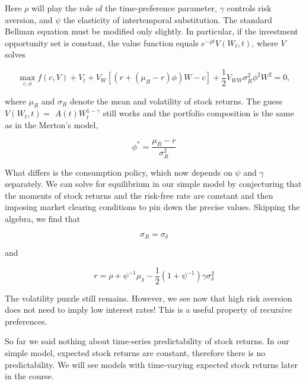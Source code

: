 \documentclass[\topdir/lecture\_notes.tex]{subfiles}
\begin{document}
Here \(\rho\) will play the role of the time-preference parameter, \(\gamma\) controls risk aversion, and \(\psi\) the elasticity of intertemporal substitution. The standard Bellman equation must be modified only slightly. In particular, if the investment opportunity set is constant, the value function equals \(e^{-\rho t} V\left(W_{t}, t\right)\), where \(V\) solves

\begin{equation}
\max _{c, \phi} f(c, V)+V_{t}+V_{W}\left[\left(r+\left(\mu_{R}-r\right) \phi\right) W-c\right]+\frac{1}{2} V_{W W} \sigma_{R}^{2} \phi^{2} W^{2}=0,
\end{equation}

where \(\mu_{R}\) and \(\sigma_{R}\) denote the mean and volatility of stock returns. The guess \(V\left(W_{t}, t\right)=\) \(A(t) W_{t}^{1-\gamma}\) still works and the portfolio composition is the same as in the Merton's model,

\begin{equation}
\phi^{*}=\frac{\mu_{R}-r}{\sigma_{R}^{2}}
\end{equation}

What differs is the consumption policy, which now depends on \(\psi\) and \(\gamma\) separately. We can solve for equilibrium in our simple model by conjecturing that the moments of stock returns and the risk-free rate are constant and then imposing market clearing conditions to pin down the precise values. Skipping the algebra, we find that

\begin{equation}
\sigma_{R}=\sigma_{\delta}
\end{equation}

and

\begin{equation}
r=\rho+\psi^{-1} \mu_{\delta}-\frac{1}{2}\left(1+\psi^{-1}\right) \gamma \sigma_{\delta}^{2}
\end{equation}

The volatility puzzle still remains. However, we see now that high risk aversion does not need to imply low interest rates! This is a useful property of recursive preferences.

So far we said nothing about time-series predictability of stock returns. In our simple model, expected stock returns are constant, therefore there is no predictability. We will see models with time-varying expected stock returns later in the course.
\end{document}
